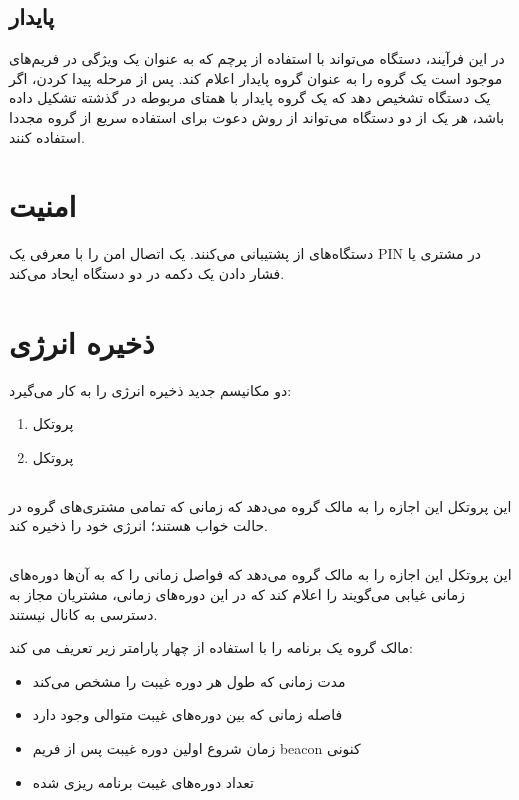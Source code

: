 \subsection{پایدار}
در این فرآیند، دستگاه می‌تواند با استفاده از پرچم 
که به عنوان یک ویژگی در فریم‌های 
موجود است یک گروه را به عنوان گروه پایدار اعلام کند.
پس از مرحله پیدا کردن، اگر یک دستگاه تشخیص دهد که یک گروه پایدار با همتای مربوطه در گذشته تشکیل داده باشد، هر یک از دو دستگاه می‌تواند از روش دعوت
 برای استفاده سریع از گروه مجددا استفاده کنند.
\cite{Camps-Mur}
\section{امنیت}
دستگاه‌های
از 
 
پشتیبانی می‌کنند.
یک اتصال امن را با معرفی یک PIN در مشتری یا فشار دادن یک دکمه در دو دستگاه 
 ایحاد می‌کند.
\cite{Camps-Mur}
\section{ذخیره انرژی}
دو مکانیسم جدید ذخیره انرژی را به کار می‌گیرد:
\begin{enumerate}
	\item پروتکل 
	\item پروتکل 
	
\end{enumerate}
\subsection{}
این پروتکل این اجازه را به مالک گروه می‌دهد که زمانی که تمامی مشتری‌های گروه در حالت خواب
هستند؛ انرژی خود را ذخیره کند.

\subsection{}
این پروتکل این اجازه را به مالک گروه می‌دهد که فواصل زمانی را که به آن‌ها دوره‌های زمانی غیابی می‌گویند را اعلام کند که در این دوره‌های زمانی، مشتریان مجاز به دسترسی به کانال نیستند.

مالک گروه یک برنامه
  را با استفاده از چهار پارامتر زیر تعریف می کند:
\begin{itemize}
  	\item مدت زمانی که طول هر دوره غیبت را مشخص می‌کند
  	\item فاصله زمانی که بین دوره‌های غیبت متوالی وجود دارد
  	\item زمان شروع اولین دوره غیبت پس از فریم beacon کنونی
  	\item تعداد دوره‌های غیبت برنامه ریزی شده
  	\cite{Camps-Mur}
\end{itemize}

